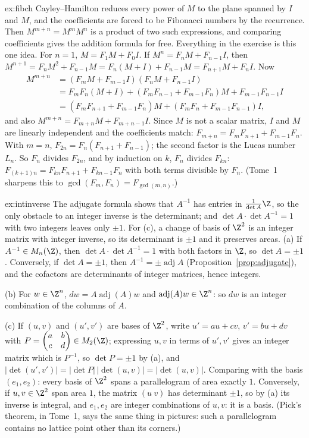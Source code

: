 \begin{solution}{ex:fibch}
\idea Cayley--Hamilton reduces every power of $M$ to the plane spanned by $I$ and $M$, and the coefficients are forced to be Fibonacci numbers by the recurrence. Then $M^{m+n}=M^mM^n$ is a product of two such expressions, and comparing coefficients gives the addition formula for free. Everything in the exercise is this one idea.
\writeup For $n=1$, $M=F_1M+F_0I$. If $M^n=F_nM+F_{n-1}I$, then $M^{n+1}=F_nM^2+F_{n-1}M=F_n(M+I)+F_{n-1}M=F_{n+1}M+F_nI$. Now
\[
\begin{aligned}
M^{m+n}&=(F_mM+F_{m-1}I)(F_nM+F_{n-1}I)\\
&=F_mF_n(M+I)+(F_mF_{n-1}+F_{m-1}F_n)M+F_{m-1}F_{n-1}I\\
&=(F_mF_{n+1}+F_{m-1}F_n)M+(F_mF_n+F_{m-1}F_{n-1})I ,
\end{aligned}
\]
and also $M^{m+n}=F_{m+n}M+F_{m+n-1}I$. Since $M$ is not a scalar matrix, $I$ and $M$ are linearly independent and the coefficients match: $F_{m+n}=F_mF_{n+1}+F_{m-1}F_n$. With $m=n$, $F_{2n}=F_n(F_{n+1}+F_{n-1})$; the second factor is the Lucas number $L_n$. So $F_n$ divides $F_{2n}$, and by induction on $k$, $F_n$ divides $F_{kn}$: $F_{(k+1)n}=F_{kn}F_{n+1}+F_{kn-1}F_n$ with both terms divisible by $F_n$. (Tome~1 sharpens this to $\gcd(F_m,F_n)=F_{\gcd(m,n)}$.)
\end{solution}

\begin{solution}{ex:intinverse}
\idea The adjugate formula shows that $A^{-1}$ has entries in $\frac1{\det A}\Z$, so the only obstacle to an integer inverse is the determinant; and $\det A\cdot\det A^{-1}=1$ with two integers leaves only $\pm1$. For (c), a change of basis of $\Z^2$ is an integer matrix with integer inverse, so its determinant is $\pm1$ and it preserves areas.
\writeup (a) If $A^{-1}\in M_n(\Z)$, then $\det A\cdot\det A^{-1}=1$ with both factors in $\Z$, so $\det A=\pm1$. Conversely, if $\det A=\pm1$, then $A^{-1}=\pm\operatorname{adj}A$ (Proposition~\ref{prop:adjugate}), and the cofactors are determinants of integer matrices, hence integers.

(b) For $w\in\Z^n$, $dw=A\operatorname{adj}(A)w$ and $\operatorname{adj}(A)w\in\Z^n$: so $dw$ is an integer combination of the columns of $A$.

(c) If $(u,v)$ and $(u',v')$ are bases of $\Z^2$, write $u'=au+cv$, $v'=bu+dv$ with $P=\begin{pmatrix}a&b\\c&d\end{pmatrix}\in M_2(\Z)$; expressing $u,v$ in terms of $u',v'$ gives an integer matrix which is $P^{-1}$, so $\det P=\pm1$ by (a), and $|\det(u',v')|=|\det P|\,|\det(u,v)|=|\det(u,v)|$. Comparing with the basis $(e_1,e_2)$: every basis of $\Z^2$ spans a parallelogram of area exactly $1$. Conversely, if $u,v\in\Z^2$ span area $1$, the matrix $(u\ v)$ has determinant $\pm1$, so by (a) its inverse is integral, and $e_1,e_2$ are integer combinations of $u,v$: it is a basis. (Pick's theorem, in Tome~1, says the same thing in pictures: such a parallelogram contains no lattice point other than its corners.)
\end{solution}

